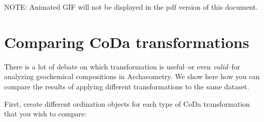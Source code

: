 \documentclass[12pt,]{book}
\begin{document}
NOTE: Animated GIF will not be displayed in the pdf version of this document.

\pagebreak

\hypertarget{comparing-coda-transformations}{%
\section{Comparing CoDa transformations}\label{comparing-coda-transformations}}

There is a lot of debate on which transformation is useful--or even \emph{valid}--for analyzing geochemical compositions in Archaeometry. We show here how you can compare the results of applying different transformations to the same dataset.

First, create different ordination objects for each type of CoDa transformation that you wish to compare:
\end{document}
